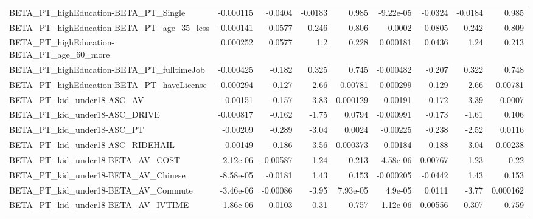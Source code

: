 \begin{tabular}{lrrrrrrrr}
BETA\_PT\_highEducation-BETA\_PT\_Single               &   -0.000115 &      -0.0404 &  -0.0183 &    0.985 &  -9.22e-05 &     -0.0324 &      -0.0184 &         0.985 \\
BETA\_PT\_highEducation-BETA\_PT\_age\_35\_less          &   -0.000141 &      -0.0577 &    0.246 &    0.806 &    -0.0002 &     -0.0805 &        0.242 &         0.809 \\
BETA\_PT\_highEducation-BETA\_PT\_age\_60\_more          &    0.000252 &       0.0577 &      1.2 &    0.228 &   0.000181 &      0.0436 &         1.24 &         0.213 \\
BETA\_PT\_highEducation-BETA\_PT\_fulltimeJob          &   -0.000425 &       -0.182 &    0.325 &    0.745 &  -0.000482 &      -0.207 &        0.322 &         0.748 \\
BETA\_PT\_highEducation-BETA\_PT\_haveLicense          &   -0.000294 &       -0.127 &     2.66 &  0.00781 &  -0.000299 &      -0.129 &         2.66 &       0.00781 \\
BETA\_PT\_kid\_under18-ASC\_AV                         &    -0.00151 &       -0.157 &     3.83 & 0.000129 &   -0.00191 &      -0.172 &         3.39 &        0.0007 \\
BETA\_PT\_kid\_under18-ASC\_DRIVE                      &   -0.000817 &       -0.162 &    -1.75 &   0.0794 &  -0.000991 &      -0.173 &        -1.61 &         0.106 \\
BETA\_PT\_kid\_under18-ASC\_PT                         &    -0.00209 &       -0.289 &    -3.04 &   0.0024 &   -0.00225 &      -0.238 &        -2.52 &        0.0116 \\
BETA\_PT\_kid\_under18-ASC\_RIDEHAIL                   &    -0.00149 &       -0.186 &     3.56 & 0.000373 &   -0.00184 &      -0.188 &         3.04 &       0.00238 \\
BETA\_PT\_kid\_under18-BETA\_AV\_COST                   &   -2.12e-06 &     -0.00587 &     1.24 &    0.213 &   4.58e-06 &     0.00767 &         1.23 &          0.22 \\
BETA\_PT\_kid\_under18-BETA\_AV\_Chinese                &   -8.58e-05 &      -0.0181 &     1.43 &    0.153 &  -0.000205 &     -0.0442 &         1.43 &         0.153 \\
BETA\_PT\_kid\_under18-BETA\_AV\_Commute                &   -3.46e-06 &     -0.00086 &    -3.95 & 7.93e-05 &    4.9e-05 &      0.0111 &        -3.77 &      0.000162 \\
BETA\_PT\_kid\_under18-BETA\_AV\_IVTIME                 &    1.86e-06 &       0.0103 &     0.31 &    0.757 &   1.12e-06 &     0.00556 &        0.307 &         0.759 \\

\end{tabular}

